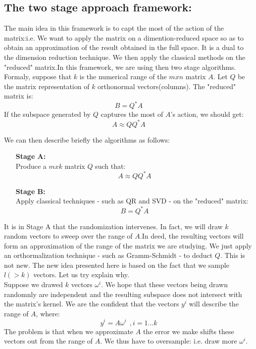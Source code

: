 \documentclass[onecolumn,11pt]{article}
\begin{document}
\subsection{The two stage approach framework:}

The main idea in this framework is to capt the most of the action of the matrix:i.e. We want to apply the matrix on a dimention-reduced space so as to obtain an approximation of the result obtained in the full space. It is a dual to the dimension reduction technique. We then apply the classical methods on the "reduced" matrix.In this framework, we are using then two stage algorithms.\\

Formaly, suppose that $k$ is the numerical range of the $m x n $ matrix $A$. Let $Q$ be the matrix representation of $k$ orthonormal vectors(columns). The "reduced" matrix is:
$$B=Q^* A$$
If the subspace generated by $Q$ captures the most of $A$'s action, we should get:
$$A\approx QQ^* A$$

We can then describe briefly the algorithms as follows:

\begin{itemize}
\item[\textbf{Stage A:}] \ \\
Produce a $m x k$ matrix $Q$ such that:
$$A\approx QQ^* A$$
\item[\textbf{Stage B:}] \ \\
Apply classical techniques - such as QR and SVD - on the "reduced" matrix:
$$B=Q^* A$$

\end{itemize}

It is in Stage A that the randomization intervenes. In fact, we will draw $k$ random vectors to sweep over the range of $A$.In deed, the resulting vectors will form an approximation of the range of the matrix we are studying. We just apply an orthormalization technique - such as Gramm-Schmidt - to deduct $Q$. This is not new.
The new idea presented here is based on the fact that we sample $l(>k)$ vectors. Let us try explain why.
\\

Suppose we drawed $k$ vectors $\omega^{i}$. We hope that these vectors being drawn randomnly are independent and the resulting subspace does not intersect with the matrix's kernel. We are the confident that the vectors $y^i$ will describe the range of $A$, where:
$$y^i=A\omega^i\ \ ,i=1...k$$
The problem is that when we approximate $A$ the error we make shifts these vectors out from the range of $A$. We thus have to oversample: i.e. draw more $\omega^{i}$.\\
\end{document}
